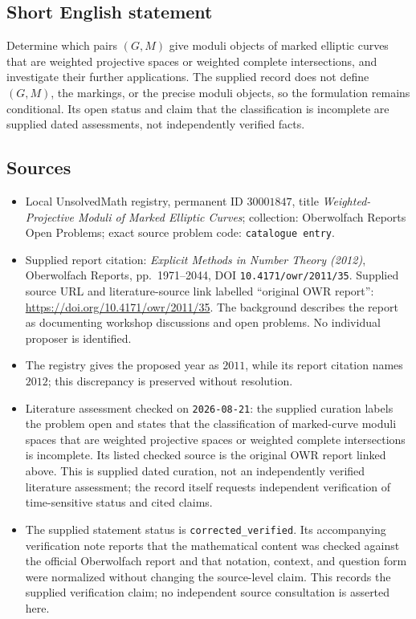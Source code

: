 \documentclass[11pt]{article}
\begin{document}
\subsection{Short English statement}
Determine which pairs $(G,M)$ give moduli objects of marked elliptic curves that are weighted projective spaces or weighted complete intersections, and investigate their further applications. The supplied record does not define $(G,M)$, the markings, or the precise moduli objects, so the formulation remains conditional. Its open status and claim that the classification is incomplete are supplied dated assessments, not independently verified facts.
\subsection{Sources}
\begin{itemize}
\item Local UnsolvedMath registry, permanent ID $30001847$, title \emph{Weighted-Projective Moduli of Marked Elliptic Curves}; collection: Oberwolfach Reports Open Problems; exact source problem code: \texttt{catalogue entry}.
\item Supplied report citation: \emph{Explicit Methods in Number Theory (2012)}, Oberwolfach Reports, pp.~1971--2044, DOI \texttt{10.4171/owr/2011/35}. Supplied source URL and literature-source link labelled ``original OWR report'': \url{https://doi.org/10.4171/owr/2011/35}. The background describes the report as documenting workshop discussions and open problems. No individual proposer is identified.
\item The registry gives the proposed year as $2011$, while its report citation names $2012$; this discrepancy is preserved without resolution.
\item Literature assessment checked on \texttt{2026-08-21}: the supplied curation labels the problem open and states that the classification of marked-curve moduli spaces that are weighted projective spaces or weighted complete intersections is incomplete. Its listed checked source is the original OWR report linked above. This is supplied dated curation, not an independently verified literature assessment; the record itself requests independent verification of time-sensitive status and cited claims.
\item The supplied statement status is \texttt{corrected\_verified}. Its accompanying verification note reports that the mathematical content was checked against the official Oberwolfach report and that notation, context, and question form were normalized without changing the source-level claim. This records the supplied verification claim; no independent source consultation is asserted here.
\end{itemize}
\end{document}
